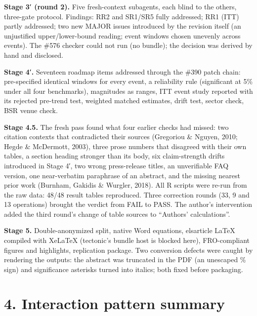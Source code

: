\documentclass[12pt,a4paper]{article}
\begin{document}
\textbf{Stage 3′ (round 2).} Five fresh-context subagents, each blind to
the others, three-gate protocol. Findings: RR2 and SR1/SR5 fully
addressed; RR1 (ITT) partly addressed; two new MAJOR issues introduced
by the revision itself (an unjustified upper/lower-bound reading; event
windows chosen unevenly across events). The \#576 checker could not run
(no bundle); the decision was derived by hand and disclosed.

\textbf{Stage 4′.} Seventeen roadmap items addressed through the \#390
patch chain: pre-specified identical windows for every event, a
reliability rule (significant at 5\% under all four benchmarks),
magnitudes as ranges, ITT event study reported with its rejected
pre-trend test, weighted matched estimates, drift test, sector check,
BSR venue check.

\textbf{Stage 4.5.} The fresh pass found what four earlier checks had
missed: two citation contexts that contradicted their sources (Gregoriou
\& Nguyen, 2010; Hegde \& McDermott, 2003), three prose numbers that
disagreed with their own tables, a section heading stronger than its
body, six claim-strength drifts introduced in Stage 4′, two wrong
press-release titles, an unverifiable FAQ version, one near-verbatim
paraphrase of an abstract, and the missing nearest prior work (Burnham,
Gakidis \& Wurgler, 2018). All R scripts were re-run from the raw data:
48/48 result tables reproduced. Three correction rounds (33, 9 and 13
operations) brought the verdict from FAIL to PASS. The author's
intervention added the third round's change of table sources to
``Authors' calculations''.

\textbf{Stage 5.} Double-anonymized split, native Word equations,
elsarticle LaTeX compiled with XeLaTeX (tectonic's bundle host is
blocked here), FRO-compliant figures and highlights, replication
package. Two conversion defects were caught by rendering the outputs:
the abstract was truncated in the PDF (an unescaped \% sign) and
significance asterisks turned into italics; both fixed before packaging.

\hypertarget{interaction-pattern-summary}{%
\section{4. Interaction pattern
summary}\label{interaction-pattern-summary}}
\end{document}
